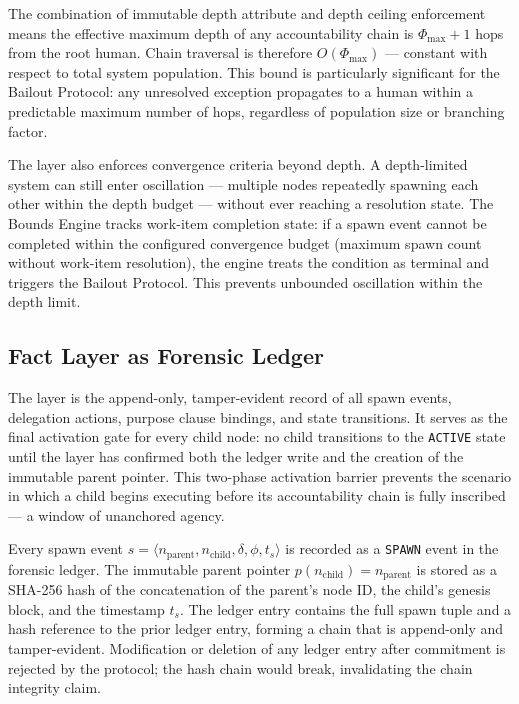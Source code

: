 The combination of immutable depth attribute and depth ceiling enforcement means the effective maximum depth of any accountability chain is $\Phi_{\max} + 1$ hops from the root human. Chain traversal is therefore $O(\Phi_{\max})$ — constant with respect to total system population. This bound is particularly significant for the Bailout Protocol: any unresolved exception propagates to a human within a predictable maximum number of hops, regardless of population size or branching factor.

The \bounds{} layer also enforces convergence criteria beyond depth. A depth-limited system can still enter oscillation — multiple nodes repeatedly spawning each other within the depth budget — without ever reaching a resolution state. The Bounds Engine tracks work-item completion state: if a spawn event cannot be completed within the configured convergence budget (maximum spawn count without work-item resolution), the engine treats the condition as terminal and triggers the Bailout Protocol. This prevents unbounded oscillation within the depth limit.

\subsection{Fact Layer as Forensic Ledger}
\label{sec:fact-layer-f ledger}

The \fact{} layer is the append-only, tamper-evident record of all spawn events, delegation actions, purpose clause bindings, and state transitions. It serves as the final activation gate for every child node: no child transitions to the \texttt{ACTIVE} state until the \fact{} layer has confirmed both the ledger write and the creation of the immutable parent pointer. This two-phase activation barrier prevents the scenario in which a child begins executing before its accountability chain is fully inscribed — a window of unanchored agency.

Every spawn event $s = \langle n_{\text{parent}}, n_{\text{child}}, \delta, \phi, t_s \rangle$ is recorded as a \texttt{SPAWN} event in the forensic ledger. The immutable parent pointer $p(n_{\text{child}}) = n_{\text{parent}}$ is stored as a SHA-256 hash of the concatenation of the parent's node ID, the child's genesis block, and the timestamp $t_s$. The ledger entry contains the full spawn tuple and a hash reference to the prior ledger entry, forming a chain that is append-only and tamper-evident. Modification or deletion of any ledger entry after commitment is rejected by the protocol; the hash chain would break, invalidating the chain integrity claim.

